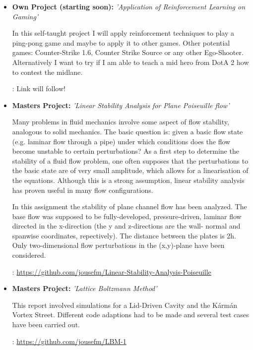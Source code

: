 \documentclass[11pt,a4paper,sans]{moderncv}        %
\begin{document}
\vspace{5pt}

\begin{itemize}
	
\item{\textbf{Own Project (starting soon):} \textit{'Application of Reinforcement Learning on Gaming'}
		
\vspace{3pt}
		
\small{In this self-taught project I will apply reinforcement techniques to play a ping-pong game and maybe to apply it to other games. Other potential games: Counter-Strike 1.6, Counter Strike Source or any other Ego-Shooter. Alternatively I want to try if I am able to teach a mid hero from DotA 2 how to contest the midlane.}}  \newline
			
\faGithub : Link will follow! \newline

\item{\textbf{Masters Project:} \textit{'Linear Stability Analysis for Plane Poiseuille flow'}

\vspace{3pt}

\small{Many problems in fluid mechanics involve some aspect of flow stability, analogous to solid mechanics. The basic question is: given a basic flow state (e.g. laminar flow through a pipe) under which conditions does the flow become unstable to certain perturbations? As a first step to determine the stability of a fluid flow problem, one often supposes that the perturbations to the basic state are of very small amplitude, which allows for a linearisation of the equations. Although this is a strong assumption, linear stability analysis has proven useful in many flow configurations.  \newline

In this assignment the stability of plane channel flow has been analyzed. The base flow was supposed to be fully-developed, pressure-driven, laminar flow directed in the x-direction (the y and z-directions are the wall- normal and spanwise coordinates, repectively). The distance between the plates is 2h. Only two-dimensional flow perturbations in the (x,y)-plane have been considered.}} \newline

\faGithub : \url{https://github.com/jousefm/Linear-Stability-Analysis-Poiseuille} \newline

\item{\textbf{Masters Project:}} \textit{'Lattice Boltzmann Method'}

\vspace{3pt}

\small{This report involved simulations for a Lid-Driven Cavity and the Kármán Vortex Street. Different code adaptions had to be made and several test cases have been carried out. } \newline

\faGithub : \url{https://github.com/jousefm/LBM-1}

\end{itemize}
\end{document}
